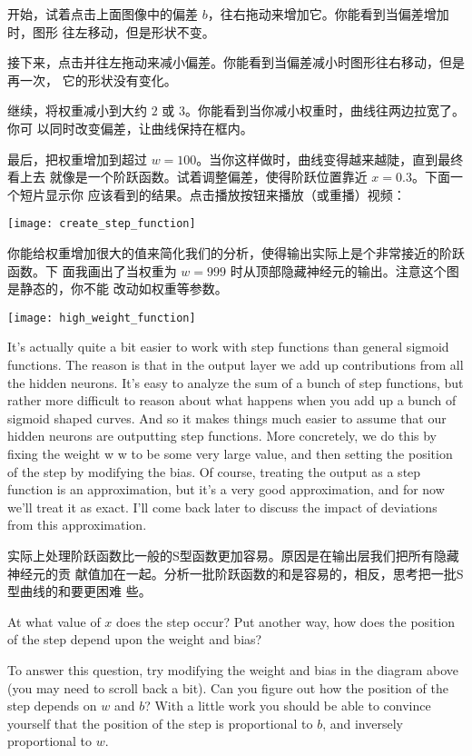 开始，试着点击上面图像中的偏差 $b$，往右拖动来增加它。你能看到当偏差增加时，图形
往左移动，但是形状不变。

接下来，点击并往左拖动来减小偏差。你能看到当偏差减小时图形往右移动，但是再一次，
它的形状没有变化。

继续，将权重减小到大约 $2$ 或 $3$。你能看到当你减小权重时，曲线往两边拉宽了。你可
以同时改变偏差，让曲线保持在框内。

最后，把权重增加到超过 $w = 100$。当你这样做时，曲线变得越来越陡，直到最终看上去
就像是一个阶跃函数。试着调整偏差，使得阶跃位置靠近 $x = 0.3$。下面一个短片显示你
应该看到的结果。点击播放按钮来播放（或重播）视频：
\begin{center}
  \texttt{[image: create\_step\_function]}
\end{center}


你能给权重增加很大的值来简化我们的分析，使得输出实际上是个非常接近的阶跃函数。下
面我画出了当权重为 $w = 999$ 时从顶部隐藏神经元的输出。注意这个图是静态的，你不能
改动如权重等参数。
\begin{center}
  \texttt{[image: high\_weight\_function]}
\end{center}

It's actually quite a bit easier to work with step functions than general
sigmoid functions. The reason is that in the output layer we add up
contributions from all the hidden neurons. It's easy to analyze the sum of a
bunch of step functions, but rather more difficult to reason about what happens
when you add up a bunch of sigmoid shaped curves. And so it makes things much
easier to assume that our hidden neurons are outputting step functions. More
concretely, we do this by fixing the weight w w to be some very large value, and
then setting the position of the step by modifying the bias. Of course, treating
the output as a step function is an approximation, but it's a very good
approximation, and for now we'll treat it as exact. I'll come back later to
discuss the impact of deviations from this approximation.

实际上处理阶跃函数比一般的S型函数更加容易。原因是在输出层我们把所有隐藏神经元的贡
献值加在一起。分析一批阶跃函数的和是容易的，相反，思考把一批S型曲线的和要更困难
些。

At what value of $x$ does the step occur? Put another way, how does the position
of the step depend upon the weight and bias?

To answer this question, try modifying the weight and bias in the diagram above
(you may need to scroll back a bit). Can you figure out how the position of the
step depends on $w$ and $b$? With a little work you should be able to convince
yourself that the position of the step is proportional to $b$, and inversely
proportional to $w$.

